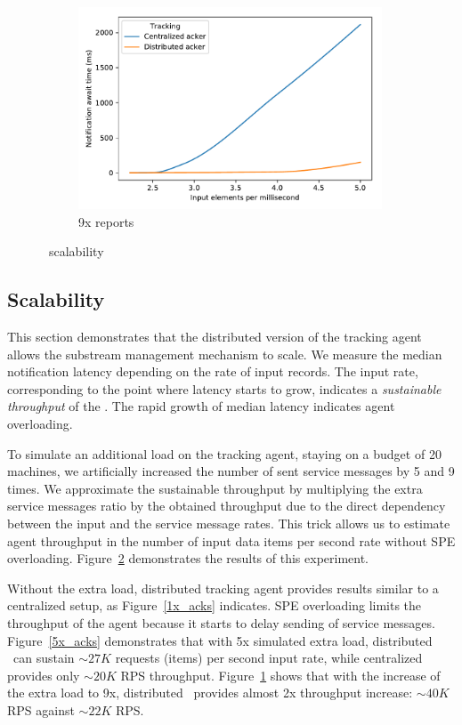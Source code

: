 \begin{figure}[t!]
\begin{subfigure}[b]{0.30\textwidth}
            \includegraphics[width=0.99\textwidth]{Chapters/Tracker/pics/scalability_09x.pdf}
            \caption{9x reports}
            \label{9x_acks}
    \end{subfigure}
    \caption{\tracker\ scalability}
    \label{notification_scalability}
\end{figure}

\subsection{Scalability}

This section demonstrates that the distributed version of the tracking agent allows the substream management mechanism to scale. We measure the median notification latency depending on the rate of input records. The input rate, corresponding to the point where latency starts to grow, indicates a {\em sustainable throughput} of the \tracker. The rapid growth of median latency indicates agent overloading. 

To simulate an additional load on the tracking agent, staying on a budget of 20 machines, we artificially increased the number of sent service messages by 5 and 9 times. We approximate the sustainable throughput by multiplying the extra service messages ratio by the obtained throughput due to the direct dependency between the input and the service message rates. This trick allows us to estimate agent throughput in the number of input data items per second rate without  SPE overloading. Figure~\ref{notification_scalability} demonstrates the results of this experiment.

Without the extra load, distributed tracking agent provides results similar to a centralized setup, as Figure~\ref{1x_acks} indicates. SPE overloading limits the throughput of the agent because it starts to delay sending of service messages. Figure~\ref{5x_acks} demonstrates that with 5x simulated extra load, distributed \tracker\ can sustain $\sim 27K$ requests (items) per second input rate, while centralized provides only $\sim 20K$ RPS throughput. Figure~\ref{9x_acks} shows that with the increase of the extra load to 9x, distributed \tracker\ provides almost 2x throughput increase: $\sim 40K$ RPS against $\sim 22K$ RPS. 

